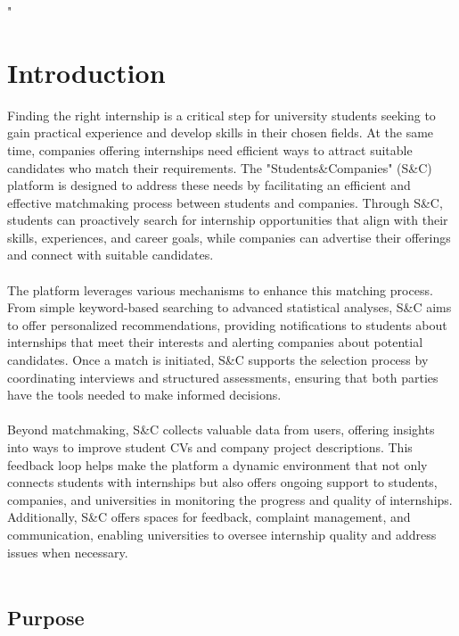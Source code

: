"\section{Introduction}

Finding the right internship is a critical step for university students seeking to gain practical experience and develop skills in their chosen fields. At the same time, companies offering internships need efficient ways to attract suitable candidates who match their requirements. The "Students\&Companies" (S\&C) platform is designed to address these needs by facilitating an efficient and effective matchmaking process between students and companies. Through S\&C, students can proactively search for internship opportunities that align with their skills, experiences, and career goals, while companies can advertise their offerings and connect with suitable candidates.\\ \\
The platform leverages various mechanisms to enhance this matching process. From simple keyword-based searching to advanced statistical analyses, S\&C aims to offer personalized recommendations, providing notifications to students about internships that meet their interests and alerting companies about potential candidates. Once a match is initiated, S\&C supports the selection process by coordinating interviews and structured assessments, ensuring that both parties have the tools needed to make informed decisions.\\ \\
Beyond matchmaking, S\&C collects valuable data from users, offering insights into ways to improve student CVs and company project descriptions. This feedback loop helps make the platform a dynamic environment that not only connects students with internships but also offers ongoing support to students, companies, and universities in monitoring the progress and quality of internships. Additionally, S\&C offers spaces for feedback, complaint management, and communication, enabling universities to oversee internship quality and address issues when necessary.\\ \\


\subsection{Purpose}

